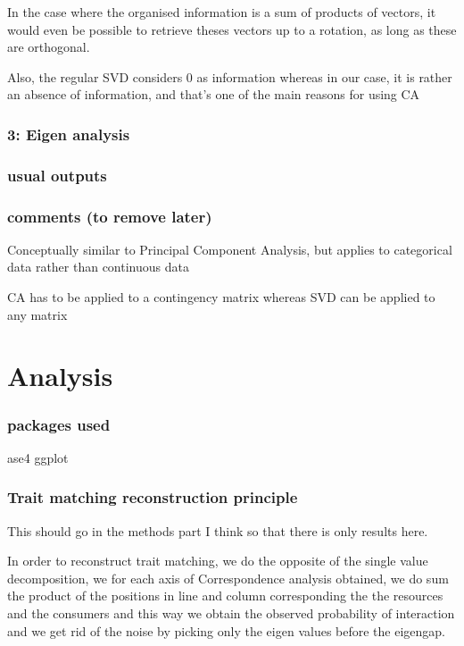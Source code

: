 \documentclass{article}
\begin{document}
In the case where the organised information is a sum of products of vectors, it would even be possible to retrieve theses vectors up to a rotation, as long as these are orthogonal.

Also, the regular SVD considers 0 as information whereas in our case, it is rather an absence of information, and that's one of the main reasons for using CA

\subsubsection{3: Eigen analysis}

\subsubsection{usual outputs}
\subsubsection{comments (to remove later)}
Conceptually similar to Principal Component Analysis, but applies to categorical data rather than continuous data

CA has to be applied to a contingency matrix whereas SVD can be applied to any matrix






\section{Analysis}

\subsubsection{packages used}

ase4 ggplot

\subsubsection{Trait matching reconstruction principle}

This should go in the methods part I think so that there is only results here.

In order to reconstruct trait matching, we do the opposite of the single value decomposition, we for each axis of Correspondence analysis obtained, we do sum the product of the positions in line and column corresponding the the resources and the consumers and this way we obtain the observed probability of interaction and we get rid of the noise by picking only the eigen values before the eigengap.
\end{document}
